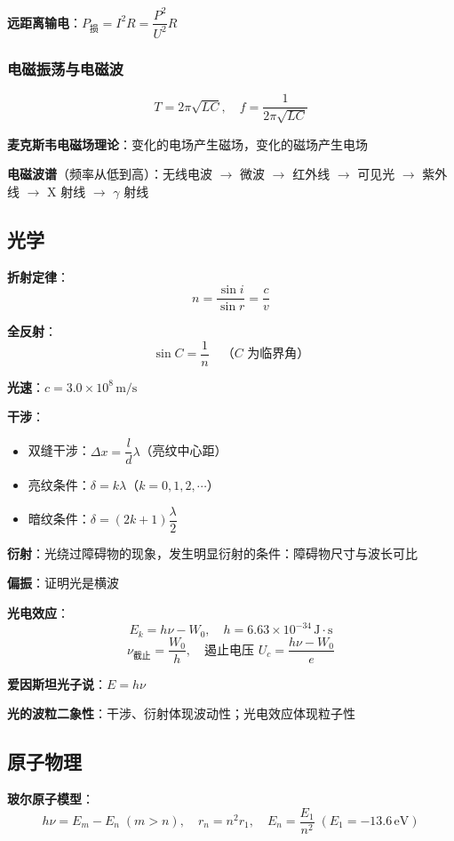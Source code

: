 \textbf{远距离输电}：$P_{\text{损}} = I^2R = \dfrac{P^2}{U^2}R$

\subsubsection{电磁振荡与电磁波}

\[
T = 2\pi\sqrt{LC},\quad
f = \frac{1}{2\pi\sqrt{LC}}
\]

\textbf{麦克斯韦电磁场理论}：变化的电场产生磁场，变化的磁场产生电场

\textbf{电磁波谱}（频率从低到高）：无线电波 $\to$ 微波 $\to$ 红外线 $\to$ 可见光 $\to$ 紫外线 $\to$ X 射线 $\to$ $\gamma$ 射线

\subsection{光学}

\textbf{折射定律}：
\[
n = \frac{\sin i}{\sin r} = \frac{c}{v}
\]

\textbf{全反射}：
\[
\sin C = \frac{1}{n}\quad\text{（$C$ 为临界角）}
\]

\textbf{光速}：$c = 3.0\times10^8\,\text{m/s}$

\textbf{干涉}：
\begin{itemize}
  \item 双缝干涉：$\Delta x = \dfrac{l}{d}\lambda$（亮纹中心距）
  \item 亮纹条件：$\delta = k\lambda$（$k=0,1,2,\cdots$）
  \item 暗纹条件：$\delta = (2k+1)\dfrac{\lambda}{2}$
\end{itemize}

\textbf{衍射}：光绕过障碍物的现象，发生明显衍射的条件：障碍物尺寸与波长可比

\textbf{偏振}：证明光是横波

\textbf{光电效应}：
\[
E_k = h\nu - W_0,\quad
h = 6.63\times10^{-34}\,\text{J}\cdot\text{s}
\]
\[
\nu_{\text{截止}} = \frac{W_0}{h},\quad
\text{遏止电压 } U_c = \frac{h\nu - W_0}{e}
\]

\textbf{爱因斯坦光子说}：$E = h\nu$

\textbf{光的波粒二象性}：干涉、衍射体现波动性；光电效应体现粒子性

\subsection{原子物理}

\textbf{玻尔原子模型}：
\[
h\nu = E_m - E_n\;(m>n),\quad
r_n = n^2 r_1,\quad
E_n = \frac{E_1}{n^2}\;(E_1=-13.6\,\text{eV})
\]

